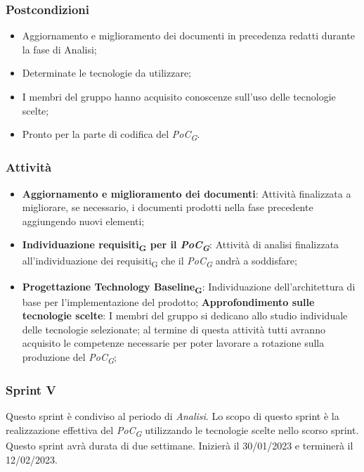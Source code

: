 \subsubsection{Postcondizioni}\:
\begin{itemize}
	\item Aggiornamento e miglioramento dei documenti in precedenza redatti durante la fase di Analisi;
	\item Determinate le tecnologie da utilizzare;
	\item I membri del gruppo hanno acquisito conoscenze sull'uso delle tecnologie scelte;
	\item Pronto per la parte di codifica del \textit{PoC\textsubscript{G}}.
\end{itemize}

\subsubsection{Attività}\:
\begin{itemize}
	\item \textbf{Aggiornamento e miglioramento dei documenti}: Attività finalizzata a migliorare, se necessario, i documenti prodotti nella fase precedente aggiungendo nuovi elementi;
	\item \textbf{Individuazione requisiti\textsubscript{G} per il \textit{PoC\textsubscript{G}}}: Attività di analisi finalizzata all’individuazione dei requisiti\textsubscript{G} che il \textit{PoC\textsubscript{G}} andrà a soddisfare;
    \item \textbf{Progettazione Technology Baseline\textsubscript{G}}: Individuazione dell’architettura di base per l’implementazione del prodotto;
        \subitem \textbf{Approfondimento sulle tecnologie scelte}: I membri del gruppo si dedicano allo studio individuale delle tecnologie selezionate; al termine di questa attività tutti avranno acquisito le competenze necessarie per poter lavorare a rotazione sulla produzione del \textit{PoC\textsubscript{G}};
\end{itemize}

\subsubsection{Sprint V}
Questo sprint è condiviso al periodo di \textit{Analisi}. Lo scopo di questo sprint è la realizzazione effettiva del \textit{PoC\textsubscript{G}} utilizzando le tecnologie scelte nello scorso sprint.
Questo sprint avrà durata di due settimane. Inizierà il 30/01/2023 e terminerà il 12/02/2023.

